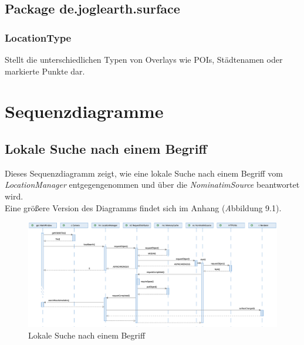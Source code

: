 \documentclass[10pt]{scrreprt}
\newcommand{\textref}[1]{\mbox{\raisebox{0.1ex}{\small$\rightarrow$ }\textit{#1}}}
\begin{document}
\vspace{5mm}
\section{Package de.joglearth.surface}
\subsection*{LocationType}
Stellt die unterschiedlichen Typen von Overlays wie POIs, Städtenamen oder markierte Punkte dar.



\chapter{Sequenzdiagramme}

\section{Lokale Suche nach einem Begriff}
Dieses Sequenzdiagramm zeigt, wie eine lokale Suche nach einem Begriff vom \textit{LocationManager} entgegengenommen und über die \textit{NominatimSource} beantwortet wird.\\[3mm]
Eine größere Version des Diagramms findet sich im Anhang (\textref Abbildung 9.1).

\vspace*{5mm}
\begin{figure}[h]
\begin{center}
\includegraphics[scale=0.28]{sequenz-search.eps}
\caption{Lokale Suche nach einem Begriff}
\end{center}
\end{figure}
\end{document}
